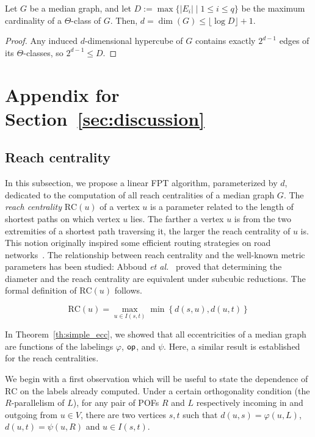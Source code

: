 \documentclass[a4paper,UKenglish,numberwithinsect,cleveref, autoref]{lipics-v2021}
\newcommand{\set}[1]{\left\{ #1 \right\}}
\newcommand{\opp}{\mbox{\textsf{op}}}
\newcommand{\rc}{\mbox{RC}}
\begin{document}
\begin{lemma}\label{lem:guigui-3}
Let $G$ be a median graph, and let $D := \max\{ |E_i| \mid 1 \leq i \leq q\}$ be the maximum cardinality of a $\Theta$-class of $G$. Then, $d = \dim(G) \leq \lfloor\log{D}\rfloor + 1$.
\end{lemma}
\begin{proof}
Any induced $d$-dimensional hypercube of $G$ contains exactly $2^{d-1}$ edges of its $\Theta$-classes, so $2^{d-1}\le D$.
\end{proof}

\section{Appendix for Section~\ref{sec:discussion}} \label{asec:discussion}

\subsection{Reach centrality} \label{asubsec:reach_centrality}

In this subsection, we propose a linear FPT algorithm, parameterized by $d$, dedicated to the computation of all reach centralities of a median graph $G$. The \textit{reach centrality} $\rc(u)$ of a vertex $u$ is a parameter related to the length of shortest paths on which vertex $u$ lies. The farther a vertex $u$ is from the two extremities of a shortest path traversing it, the larger the reach centrality of $u$ is. This notion originally inspired some efficient routing strategies on road networks~\cite{Gu04}. The relationship between reach centrality and the well-known metric parameters has been studied: Abboud {\em et al.}~\cite{AbGrWi15} proved that determining the diameter and the reach centrality are equivalent under subcubic reductions. The formal definition of $\rc(u)$ follows.

\begin{equation}
\rc(u) = \max_{u \in I(s,t)} \min \set{d(s,u),d(u,t)}
\label{eq:reach_centrality}
\end{equation}

In Theorem~\ref{th:simple_ecc}, we showed that all eccentricities of a median graph are functions of the labelings $\varphi$, $\opp$, and $\psi$. Here, a similar result is established for the reach centralities.

We begin with a first observation which will be useful to state the dependence of $\rc$ on the labels already computed. Under a certain orthogonality condition (the $R$-parallelism of $L$), for any pair of POFs $R$ and $L$ respectively incoming in and outgoing from $u \in V$, there are two vertices $s,t$ such that $d(u,s) = \varphi(u,L)$, $d(u,t) = \psi(u,R)$ and $u \in I(s,t)$.
\end{document}
